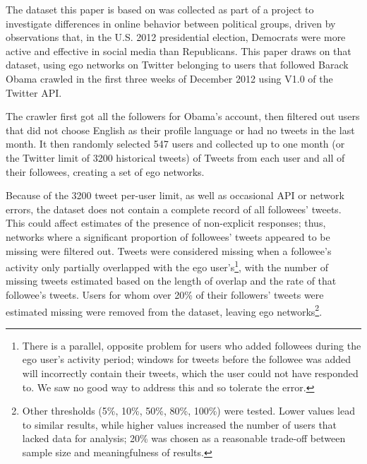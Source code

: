The dataset this paper is based on was collected as part of a project to investigate differences in online behavior between political groups, driven by observations that, in the U.S. 2012 presidential election, Democrats were more active and effective in social media than Republicans.  This paper draws on that dataset, using ego networks on Twitter belonging to users that followed Barack Obama crawled in the first three weeks of December 2012 using V1.0 of the Twitter API.  

The crawler first got all the followers for Obama's account, then filtered out users that did not choose English as their profile language or had no tweets in the last month.  It then randomly selected 547 users and collected up to one month (or the Twitter limit of 3200 historical tweets) of Tweets from each user and all of their followees, creating a set of ego networks.

Because of the 3200 tweet per-user limit, as well as occasional API or network errors, the dataset does not contain a complete record of all followees' tweets.  This could affect estimates of the presence of non-explicit responses; thus, networks where a significant proportion of followees' tweets appeared to be missing were filtered out.  Tweets were considered missing when a followee's activity only partially overlapped with the ego user's\footnote{There is a parallel, opposite problem for users who added followees during the ego user's activity period; windows for tweets before the followee was added will incorrectly contain their tweets, which the user could not have responded to.  We saw no good way to address this and so tolerate the error.}, with the number of missing tweets estimated based on the length of overlap and the rate of that followee's tweets.  Users for whom over 20\% of their followers' tweets were estimated missing were removed from the dataset, leaving \totalUsers{} ego networks\footnote{Other thresholds (5\%, 10\%, 50\%, 80\%, 100\%) were tested.  Lower values lead to similar results, while higher values increased the number of users that lacked data for analysis; 20\% was chosen as a reasonable trade-off between sample size and meaningfulness of results.}.

